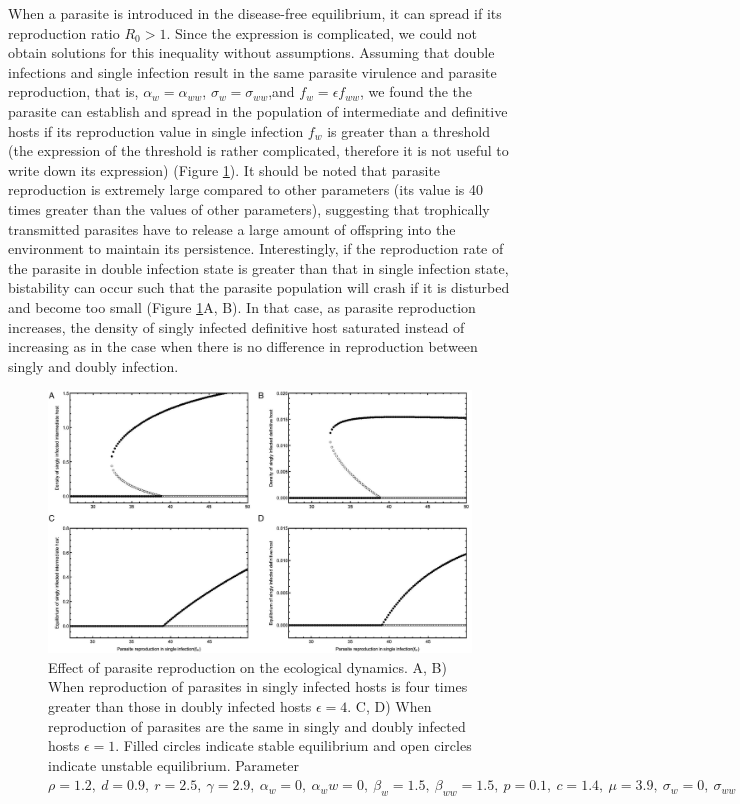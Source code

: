 \documentclass[11pt]{article}
\begin{document}
When a parasite is introduced in the disease-free equilibrium, it can spread if its reproduction ratio $R_0 > 1$. 
Since the expression is complicated, we could not obtain solutions for this inequality without assumptions. 
Assuming that double infections and single infection result in the same parasite virulence and parasite reproduction, that is, $\alpha_w = \alpha_{ww}$, $\sigma_w = \sigma_{ww}$,and $f_w = \epsilon f_{ww}$, we found the the parasite can establish and spread in the population of intermediate and definitive hosts if its reproduction value in single infection $f_w$ is greater than a threshold (the expression of the threshold is rather complicated, therefore it is not useful to write down its expression) (Figure \ref{fig:bistability}). It should be noted that parasite reproduction is extremely large compared to other parameters (its value is 40 times greater than the values of other parameters), suggesting that trophically transmitted parasites have to release a large amount of offspring into the environment to maintain its persistence. Interestingly, if the reproduction rate of the parasite in double infection state is greater than that in single infection state, bistability can occur such that the parasite population will crash if it is disturbed and become too small (Figure \ref{fig:bistability}A, B). In that case, as parasite reproduction increases, the density of singly infected definitive host saturated instead of increasing as in the case when there is no difference in reproduction between singly and doubly infection. 

\begin{figure}[!ht]
\includegraphics[width = \textwidth]{Figures/bistability.jpeg}
\caption{Effect of parasite reproduction on the ecological dynamics. A, B) When reproduction of parasites in singly infected hosts is four times greater than those in doubly infected hosts $\epsilon = 4$. C, D) When reproduction of parasites are the same in singly and doubly infected hosts $\epsilon = 1$. Filled circles indicate stable equilibrium and open circles indicate unstable equilibrium. Parameter $\rho = 1.2, \  d = 0.9, \  r = 2.5, \ \gamma = 2.9, \ \alpha_w = 0, \ \alpha_ww =  0, \ \beta_w = 1.5, \ \beta_{ww} = 1.5, \ p = 0.1, \  c = 1.4, \ \mu = 3.9,  \ \sigma_w = 0, \ \sigma_{ww} = 0, \  q = 0.01, \ \delta = 0.9, \ k = 0.26$
}
\label{fig:bistability}
\end{figure}
\end{document}
